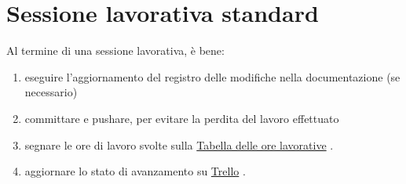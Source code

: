 \chapter{Sessione lavorativa standard}

Al termine di una sessione lavorativa, è bene:
\begin{enumerate}[1.]
\item eseguire l'aggiornamento del registro delle modifiche nella documentazione (se necessario)
\item committare e pushare, per evitare la perdita del lavoro effettuato
\item segnare le ore di lavoro svolte sulla
\href{https://docs.google.com/spreadsheets/d/12esX1ISWQOKM-fjuHTLmAzRN0cWltksn7eGiPsBHBI0/edit?usp=sharing}{Tabella delle ore lavorative} \cite{TabellaDelleOreLavorative}.
\item aggiornare lo stato di avanzamento su
\href{https://trello.com/b/hIEOGbE9/jawadruids}{Trello} \cite{TrelloJawaDruids}.
\end{enumerate}
